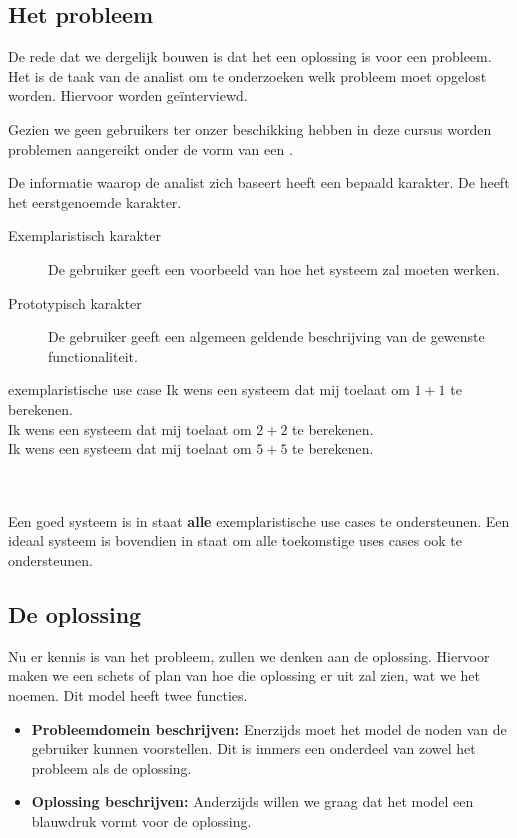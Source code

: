\documentclass[../main.tex]{subfiles}
\begin{document}
\subsection{Het probleem}
De rede dat we dergelijk  bouwen is dat het een oplossing is voor een probleem. Het is de taak van de analist om te onderzoeken welk probleem moet opgelost worden. Hiervoor worden  ge\"interviewd.

\begin{indented}
Gezien we geen gebruikers ter onzer beschikking hebben in deze cursus worden problemen aangereikt onder de vorm van een .
\end{indented}
\noindent
De informatie waarop de analist zich baseert heeft een bepaald karakter. De  heeft het eerstgenoemde karakter.
\begin{description}
	\item[Exemplaristisch karakter] De gebruiker geeft een voorbeeld van hoe het systeem zal moeten werken.
	\item[Prototypisch karakter] De gebruiker geeft een algemeen geldende beschrijving van de gewenste functionaliteit.
\end{description}
\begin{ex}{exemplaristische use case}
Ik wens een systeem dat mij toelaat om $1+1$ te berekenen. \\
Ik wens een systeem dat mij toelaat om $2+2$ te berekenen. \\
Ik wens een systeem dat mij toelaat om $5+5$ te berekenen.
\end{ex}
\\\\
Een goed systeem is in staat \textbf{alle} exemplaristische use cases te ondersteunen. Een ideaal systeem is bovendien in staat om alle toekomstige uses cases ook te ondersteunen.

\subsection{De oplossing}
Nu er kennis is van het probleem, zullen we denken aan de oplossing. Hiervoor maken we een schets of plan van hoe die oplossing er uit zal zien, wat we het  noemen. Dit model heeft twee functies.

\begin{itemize}
	\item \textbf{Probleemdomein beschrijven:} Enerzijds moet het model de noden van de gebruiker kunnen voorstellen. Dit is immers een onderdeel van zowel het probleem als de oplossing.
	\item \textbf{Oplossing beschrijven:} Anderzijds willen we graag dat het model een blauwdruk vormt voor de oplossing.
\end{itemize}
\noindent
\end{document}
